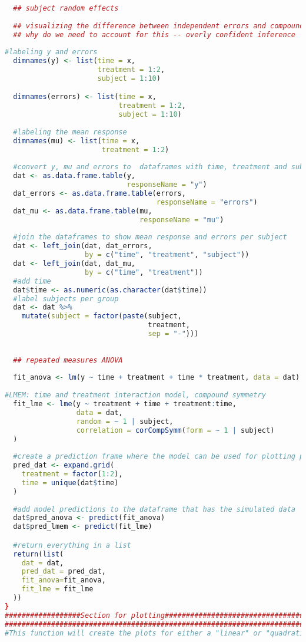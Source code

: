 \documentclass[
]{article}
\begin{document}
\begin{lstlisting}[language=R]
  
  ## subject random effects
  
  ## visualizing the difference between independent errors and compound symmetry
  ## why do we need to account for this -- overly confident inference
  
#labeling y and errors  
  dimnames(y) <- list(time = x, 
                      treatment = 1:2, 
                      subject = 1:10)

  dimnames(errors) <- list(time = x, 
                           treatment = 1:2, 
                           subject = 1:10)
  
  #labeling the mean response
  dimnames(mu) <- list(time = x, 
                       treatment = 1:2)
  
  #convert y, mu and errors to  dataframes with time, treatment and subject columns
  dat <- as.data.frame.table(y, 
                             responseName = "y")
  dat_errors <- as.data.frame.table(errors, 
                                    responseName = "errors")
  dat_mu <- as.data.frame.table(mu, 
                                responseName = "mu")
  
  #join the dataframes to show mean response and errors per subject
  dat <- left_join(dat, dat_errors, 
                   by = c("time", "treatment", "subject"))
  dat <- left_join(dat, dat_mu, 
                   by = c("time", "treatment"))
  #add time
  dat$time <- as.numeric(as.character(dat$time))
  #label subjects per group
  dat <- dat %>%
    mutate(subject = factor(paste(subject, 
                                  treatment, 
                                  sep = "-")))
  
  
  ## repeated measures ANOVA 
  
  fit_anova <- lm(y ~ time + treatment + time * treatment, data = dat)
  
#LMEM: time and treatment interaction model, compound symmetry 
  fit_lme <- lme(y ~ treatment + time + treatment:time,
                 data = dat,
                 random = ~ 1 | subject,
                 correlation = corCompSymm(form = ~ 1 | subject)
  )
  
  #create a prediction frame where the model can be used for plotting purposes
  pred_dat <- expand.grid(
    treatment = factor(1:2), 
    time = unique(dat$time)
  )
  
  #add model predictions to the dataframe that has the simulated data
  dat$pred_anova <- predict(fit_anova)
  dat$pred_lmem <- predict(fit_lme)

  #return everything in a list
  return(list(
    dat = dat,
    pred_dat = pred_dat,
    fit_anova=fit_anova,
    fit_lme = fit_lme
  ))
}
##################Section for plotting#################################
#######################################################################
#This function will create the plots for either a "linear" or "quadratic" response


\end{lstlisting}
\end{document}

